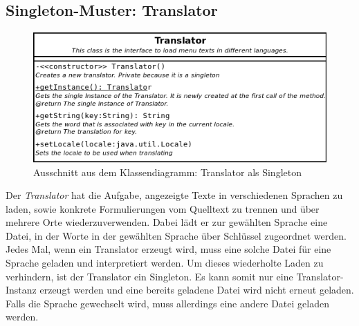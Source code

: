 \documentclass[parskip=full]{scrartcl}
\begin{document}
\subsection{Singleton-Muster: Translator}
\begin{figure}[H]
  \centering
  \includegraphics[scale=0.4]{design/pattern-screenshots/singleton-Translator.png}
  \caption{Ausschnitt aus dem Klassendiagramm: Translator als Singleton}
\end{figure}
Der \emph{Translator} hat die Aufgabe, angezeigte Texte in verschiedenen Sprachen zu laden, sowie konkrete Formulierungen
vom Quelltext zu trennen und über mehrere Orte wiederzuverwenden.
Dabei lädt er zur gewählten Sprache eine Datei, in der Worte in der gewählten Sprache über Schlüssel
zugeordnet werden. Jedes Mal, wenn ein Translator erzeugt wird, muss eine solche Datei
für eine Sprache geladen und interpretiert werden. Um dieses wiederholte Laden zu verhindern, ist der Translator ein Singleton.
Es kann somit nur eine Translator-Instanz erzeugt werden und eine bereits geladene Datei
wird nicht erneut geladen. Falls die Sprache gewechselt wird, muss allerdings eine andere Datei geladen werden.

\pagebreak
\end{document}
